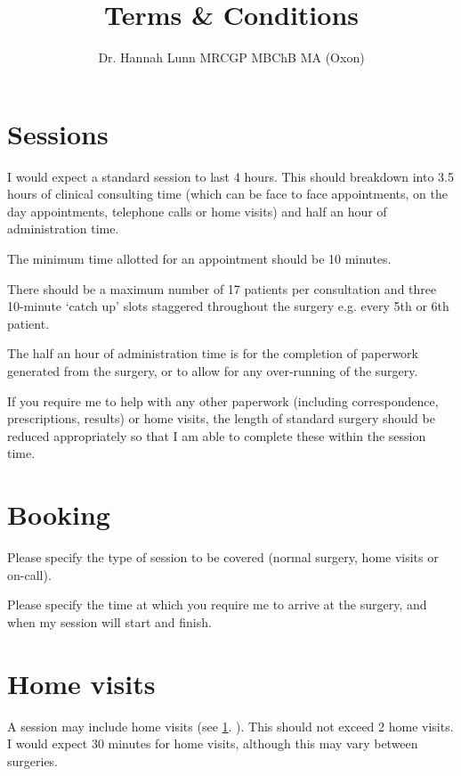 \documentclass[12pt, a4paper]{article}
\title{Terms \& Conditions\vspace{-2ex}}}
\author{Dr. Hannah Lunn MRCGP MBChB MA (Oxon)\vspace{-2ex}}
\begin{document}
\maketitle

\section{Sessions}
\label{sessions}

I would expect a standard session to last 4 hours.
This should breakdown into 3.5 hours of clinical consulting time (which can be face to face appointments, on the day appointments, telephone calls or home visits) and half an hour of administration time.

The minimum time allotted for an appointment should be 10 minutes.

There should be a maximum number of 17 patients per consultation and three 10-minute ‘catch up’ slots staggered throughout the surgery e.g. every 5th or 6th patient.

The half an hour of administration time is for the completion of paperwork generated from the surgery, or to allow for any over-running of the surgery.

If you require me to help with any other paperwork (including correspondence, prescriptions, results) or home visits, the length of standard surgery should be reduced appropriately so that I am able to complete these within the session time.

\section{Booking}

Please specify the type of session to be covered (normal surgery, home visits or on-call).

Please specify the time at which you require me to arrive at the surgery, and when my session will start and finish.

\section{Home visits}

A session may include home visits (see \ref{sessions}. ).
This should not exceed 2 home visits.
I would expect 30 minutes for home visits, although this may vary between surgeries.
\end{document}
